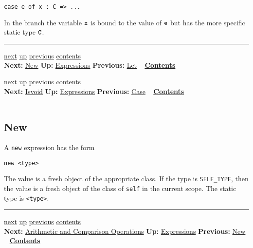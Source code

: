 \documentclass[]{article}
\begin{document}
\begin{verbatim}
case e of x : C => ...
\end{verbatim}

In the branch the variable $\tt x$ is bound to the value of $\tt e$ but
has the more specific static type $\tt C$.

\begin{center}\rule{3in}{0.4pt}\end{center}

\href{node23.html}{next} \href{node13.html}{up}
\href{node21.html}{previous} \href{node1.html}{contents} \\
\textbf{Next:} \href{node23.html}{New} \textbf{Up:}
\href{node13.html}{Expressions} \textbf{Previous:}
\href{node21.html}{Let} ~ \textbf{\href{node1.html}{Contents}}

\href{node24.html}{next} \href{node13.html}{up}
\href{node22.html}{previous} \href{node1.html}{contents} \\
\textbf{Next:} \href{node24.html}{Isvoid} \textbf{Up:}
\href{node13.html}{Expressions} \textbf{Previous:}
\href{node22.html}{Case} ~ \textbf{\href{node1.html}{Contents}} \\ \\

\subsection{New}

A \texttt{new} expression has the form

\begin{verbatim}
new <type>
\end{verbatim}

The value is a fresh object of the appropriate class. If the type is
\texttt{SELF\_TYPE}, then the value is a fresh object of the class of
\texttt{self} in the current scope. The static type is
\texttt{\textless{}type\textgreater{}}.

\begin{center}\rule{3in}{0.4pt}\end{center}

\href{node25.html}{next} \href{node13.html}{up}
\href{node23.html}{previous} \href{node1.html}{contents} \\
\textbf{Next:} \href{node25.html}{Arithmetic and Comparison Operations}
\textbf{Up:} \href{node13.html}{Expressions} \textbf{Previous:}
\href{node23.html}{New} ~ \textbf{\href{node1.html}{Contents}} \\ \\
\end{document}
